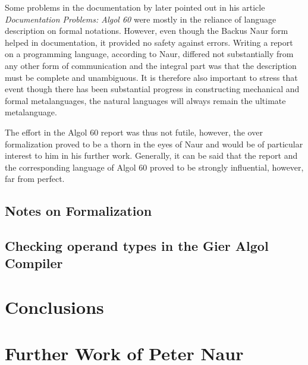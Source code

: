 \documentclass{article}
\begin{document}
Some problems in the documentation by \citet{naur1963documentation} later pointed out in his article \textit{Documentation Problems: Algol 60} were mostly in the reliance of language description on formal notations. However, even though the Backus Naur form helped in documentation, it provided no safety against errors. Writing a report on a programming language, according to Naur, differed not substantially from any other form of communication and the integral part was that the description must be complete and unambiguous. It is therefore also important to stress that event though there has been substantial progress in constructing mechanical and formal metalanguages, the natural languages will always remain the ultimate metalanguage.

The effort in the Algol 60 report was thus not futile, however, the over formalization proved to be a thorn in the eyes of Naur and would be of particular interest to him in his further work. Generally, it can be said that the report and the corresponding language of Algol 60 proved to be strongly influential, however, far from perfect.

\subsection{Notes on Formalization}


\subsection{Checking operand types in the Gier Algol Compiler}

\section{Conclusions}

\section{Further Work of Peter Naur}



\end{document}
